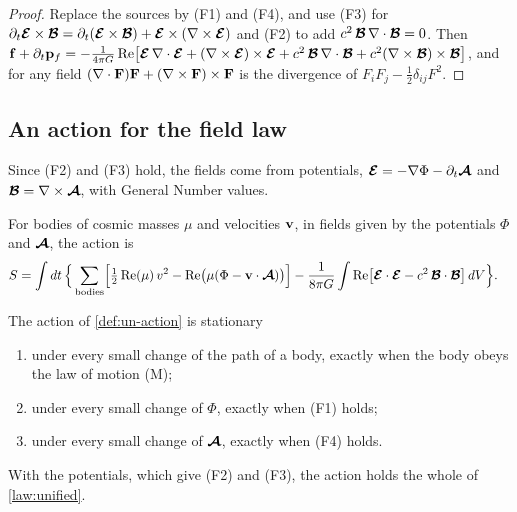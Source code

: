 \begin{proof}
Replace the sources by (F1) and (F4), and use (F3) for $\partial_t\boldsymbol{\mathcal{E}}\times\boldsymbol{\mathcal{B}} = \partial_t(\boldsymbol{\mathcal{E}}\times\boldsymbol{\mathcal{B}}) + \boldsymbol{\mathcal{E}}\times(\nabla\times\boldsymbol{\mathcal{E}})$ and (F2) to add $c^2\,\boldsymbol{\mathcal{B}}\,\nabla\cdot\boldsymbol{\mathcal{B}} = 0$. Then $\mathbf{f} + \partial_t\mathbf{p}_f = -\frac{1}{4\pi G}\operatorname{Re}\bigl[\boldsymbol{\mathcal{E}}\,\nabla\cdot\boldsymbol{\mathcal{E}} + (\nabla\times\boldsymbol{\mathcal{E}})\times\boldsymbol{\mathcal{E}} + c^2\,\boldsymbol{\mathcal{B}}\,\nabla\cdot\boldsymbol{\mathcal{B}} + c^2(\nabla\times\boldsymbol{\mathcal{B}})\times\boldsymbol{\mathcal{B}}\bigr]$, and for any field $(\nabla\cdot\mathbf{F})\mathbf{F} + (\nabla\times\mathbf{F})\times\mathbf{F}$ is the divergence of $F_iF_j - \tfrac12\delta_{ij}F^2$.
\end{proof}

\subsection{An action for the field law}\label{subsec:un-action}

Since (F2) and (F3) hold, the fields come from potentials, $\boldsymbol{\mathcal{E}} = -\nabla\Phi - \partial_t\boldsymbol{\mathcal{A}}$ and $\boldsymbol{\mathcal{B}} = \nabla\times\boldsymbol{\mathcal{A}}$, with General Number values.

\begin{definition}\label{def:un-action}
For bodies of cosmic masses $\mu$ and velocities $\mathbf{v}$, in fields given by the potentials $\Phi$ and $\boldsymbol{\mathcal{A}}$, the action is
\begin{align*}
S = \int dt\,\Bigl\{&\sum_{\text{bodies}}\Bigl[\tfrac12\operatorname{Re}(\mu)\,v^2 - \operatorname{Re}\bigl(\mu(\Phi - \mathbf{v}\cdot\boldsymbol{\mathcal{A}})\bigr)\Bigr]
- \frac{1}{8\pi G}\int\operatorname{Re}\bigl[\boldsymbol{\mathcal{E}}\cdot\boldsymbol{\mathcal{E}} - c^2\,\boldsymbol{\mathcal{B}}\cdot\boldsymbol{\mathcal{B}}\bigr]\,dV\Bigr\} .
\end{align*}
\end{definition}

\begin{theorem}\label{thm:un-action}
The action of \cref{def:un-action} is stationary
\begin{enumerate}[label=(\roman*)]
  \item under every small change of the path of a body, exactly when the body obeys the law of motion (M);
  \item under every small change of $\Phi$, exactly when (F1) holds;
  \item under every small change of $\boldsymbol{\mathcal{A}}$, exactly when (F4) holds.
\end{enumerate}
With the potentials, which give (F2) and (F3), the action holds the whole of \cref{law:unified}.
\end{theorem}

